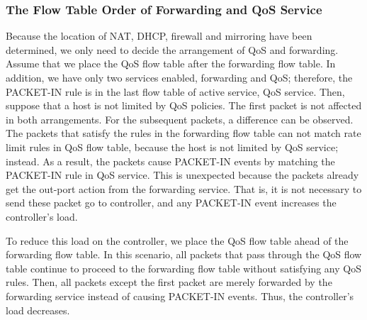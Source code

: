 \subsubsection{The Flow Table Order of Forwarding and QoS Service}
Because the location of NAT, DHCP, firewall and mirroring have been determined, we only need to decide the arrangement of QoS and forwarding. Assume that we place the QoS flow table after the forwarding flow table. In addition, we have only two services enabled, forwarding and QoS; therefore, the PACKET-IN rule is in the last flow table of active service, QoS service. Then, suppose that a host is not limited by QoS policies. The first packet is not affected in both arrangements. For the subsequent packets, a difference can be observed. The packets that satisfy the rules in the forwarding flow table can not match rate limit rules in QoS flow table, because the host is not limited by QoS service; instead. As a result, the packets cause PACKET-IN events by matching the PACKET-IN rule in QoS service. This is unexpected because the packets already get the out-port action from the forwarding service. That is, it is not necessary to send these packet go to controller, and any PACKET-IN event increases the controller’s load.

To reduce this load on the controller, we place the QoS flow table ahead of the forwarding flow table. In this scenario, all packets that pass through the QoS flow table continue to proceed to the forwarding flow table without satisfying any QoS rules. Then, all packets except the first packet are merely forwarded by the forwarding service instead of causing PACKET-IN events. Thus, the controller’s load decreases.
